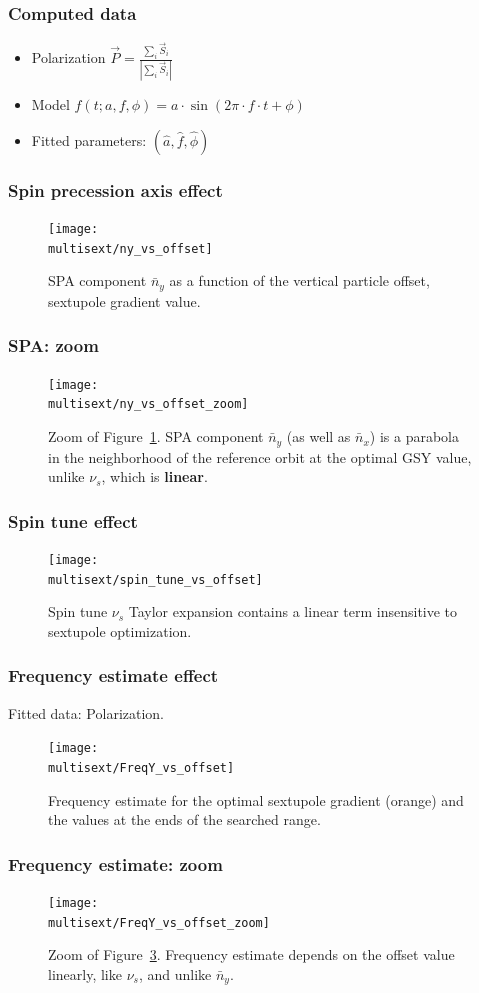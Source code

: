 \documentclass{beamer}
\newcommand{\home}{\string~}
\newcommand{\Artem}{\home/REPOS/COSYINF/img/Artem}
\newcommand{\multisext}{\Artem/multisext_test}
\begin{document}
\begin{frame}\frametitle{Computed data}
  \begin{itemize}
  \item Polarization $\vec P = \frac{\sum_i\vec S_i}{|\sum_i\vec S_i|}$
  \item Model  $f(t; a,f,\phi) = a\cdot \sin(2\pi\cdot f\cdot t + \phi)$
  \item Fitted parameters:  $(\hat a, \hat f, \hat\phi)$
  \end{itemize}
\end{frame}

\begin{frame}\frametitle{Spin precession axis effect}
  \begin{figure}[H]
    \centering
    \texttt{[image: \\multisext/ny\_vs\_offset]}
    \caption{SPA component $\bar n_y$ as a function of the vertical particle offset, sextupole gradient value.\label{fig:DECOH_full_ny}}
  \end{figure}
\end{frame}

\begin{frame}\frametitle{SPA: zoom}
  \begin{figure}[H]
    \texttt{[image: \\multisext/ny\_vs\_offset\_zoom]}
    \caption{Zoom of Figure~\ref{fig:DECOH_full_ny}. SPA component $\bar
      n_y$ (as well as $\bar n_x$) is a parabola in the neighborhood of the reference orbit at
      the optimal GSY value, unlike $\nu_s$, which is \textbf{linear}.}
  \end{figure}
\end{frame}

\begin{frame}\frametitle{Spin tune effect}
  \begin{figure}[H]
    \centering
    \texttt{[image: \\multisext/spin\_tune\_vs\_offset]}
    \caption{Spin tune $\nu_s$ Taylor expansion contains a linear term insensitive to sextupole optimization.\label{fig:SpinTune_vs_Y0_GSY}}
  \end{figure}
\end{frame}
\begin{frame}\frametitle{Frequency estimate effect}
  Fitted data: Polarization.
  \begin{figure}[H]
    \centering
    \texttt{[image: \\multisext/FreqY\_vs\_offset]}
    \caption{Frequency estimate for the optimal sextupole gradient (orange) and the values at the ends of the searched range.\label{fig:FreqY_vs_offset}}
  \end{figure}
\end{frame}
\begin{frame}\frametitle{Frequency estimate: zoom}
  \begin{figure}[H]
    \texttt{[image: \\multisext/FreqY\_vs\_offset\_zoom]}
    \caption{Zoom of Figure~\ref{fig:FreqY_vs_offset}. Frequency estimate depends on the offset value linearly,
      like  $\nu_s$, and unlike $\bar n_y$.}
  \end{figure}
\end{frame}
\end{document}
